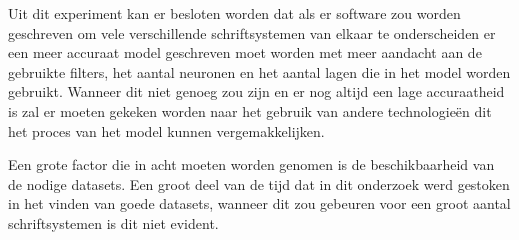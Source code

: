 Uit dit experiment kan er besloten worden dat als er software zou worden geschreven om vele verschillende schriftsystemen van elkaar te onderscheiden er een meer accuraat model geschreven moet worden met meer aandacht aan de gebruikte filters, het aantal neuronen en het aantal lagen die in het model worden gebruikt.
Wanneer dit niet genoeg zou zijn en er nog altijd een lage accuraatheid is zal er moeten gekeken worden naar het gebruik van andere technologieën dit het proces van het model kunnen vergemakkelijken.

Een grote factor die in acht moeten worden genomen is de beschikbaarheid van de nodige datasets. Een groot deel van de tijd dat in dit onderzoek werd gestoken in het vinden van goede datasets, wanneer dit zou gebeuren voor een groot aantal schriftsystemen is dit niet evident.







